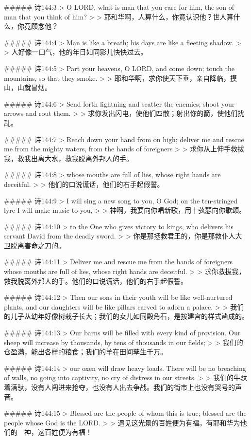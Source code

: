 ##### 诗144:3
> O LORD, what is man that you care for him, the son of man that you think of him?
>
> 耶和华啊，人算什么，你竟认识他？世人算什么，你竟顾念他？


##### 诗144:4
> Man is like a breath; his days are like a fleeting shadow.
>
> 人好像一口气，他的年日如同影儿快快过去。


##### 诗144:5
> Part your heavens, O LORD, and come down; touch the mountains, so that they smoke.
>
> 耶和华啊，求你使天下垂，亲自降临，摸山，山就冒烟。


##### 诗144:6
> Send forth lightning and scatter the enemies; shoot your arrows and rout them.
>
> 求你发出闪电，使他们四散；射出你的箭，使他们扰乱。


##### 诗144:7
> Reach down your hand from on high; deliver me and rescue me from the mighty waters, from the hands of foreigners
>
> 求你从上伸手救拔我，救我出离大水，救我脱离外邦人的手。


##### 诗144:8
> whose mouths are full of lies, whose right hands are deceitful.
>
> 他们的口说谎话，他们的右手起假誓。


##### 诗144:9
> I will sing a new song to you, O God; on the ten-stringed lyre I will make music to you,
>
> 神啊，我要向你唱新歌，用十弦瑟向你歌颂。


##### 诗144:10
> to the One who gives victory to kings, who delivers his servant David from the deadly sword.
>
> 你是那拯救君王的，你是那救仆人大卫脱离害命之刀的。


##### 诗144:11
> Deliver me and rescue me from the hands of foreigners whose mouths are full of lies, whose right hands are deceitful.
>
> 求你救拔我，救我脱离外邦人的手。他们的口说谎话，他们的右手起假誓。


##### 诗144:12
> Then our sons in their youth will be like well-nurtured plants, and our daughters will be like pillars carved to adorn a palace.
>
> 我们的儿子从幼年好像树栽子长大；我们的女儿如同殿角石，是按建宫的样式凿成的。


##### 诗144:13
> Our barns will be filled with every kind of provision. Our sheep will increase by thousands, by tens of thousands in our fields;
>
> 我们的仓盈满，能出各样的粮食；我们的羊在田间孳生千万。


##### 诗144:14
> our oxen will draw heavy loads. There will be no breaching of walls, no going into captivity, no cry of distress in our streets.
>
> 我们的牛驮着满驮，没有人闯进来抢夺，也没有人出去争战。我们的街市上也没有哭号的声音。


##### 诗144:15
> Blessed are the people of whom this is true; blessed are the people whose God is the LORD.
>
> 遇见这光景的百姓便为有福。有耶和华为他们的　神，这百姓便为有福！


